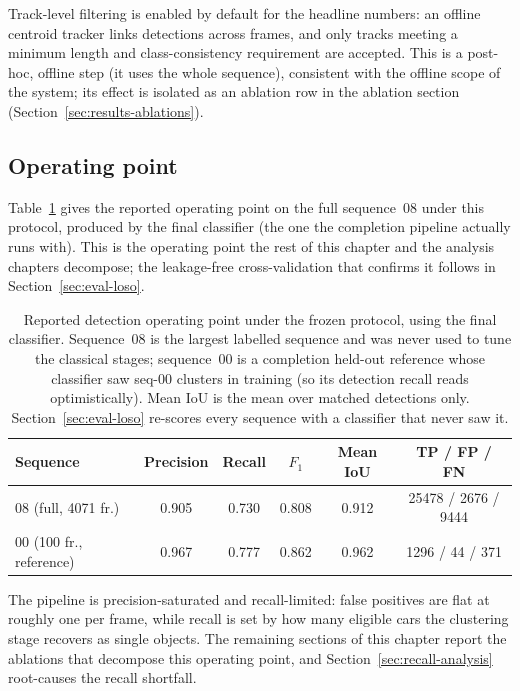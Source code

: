 Track-level filtering is enabled by default for the headline numbers: an offline
centroid tracker links detections across frames, and only tracks meeting a
minimum length and class-consistency requirement are accepted. This is a
post-hoc, offline step (it uses the whole sequence), consistent with the
offline scope of the system; its effect is isolated as an ablation row in the
ablation section (Section~\ref{sec:results-ablations}).

\subsection{Operating point}
\label{sec:eval-operating-point}

Table~\ref{tab:headline} gives the reported operating point on the full
sequence~08 under this protocol, produced by the final classifier (the one the
completion pipeline actually runs with). This is the operating point the rest of
this chapter and the analysis chapters decompose; the leakage-free
cross-validation that confirms it follows in Section~\ref{sec:eval-loso}.

\begin{table}[H]
  \centering
  \caption{Reported detection operating point under the frozen protocol, using
    the final classifier. Sequence~08 is the largest labelled sequence and was
    never used to tune the classical stages; sequence~00 is a completion held-out
    reference whose classifier saw seq-00 clusters in training (so its detection
    recall reads optimistically). Mean IoU is the mean over matched detections
    only. Section~\ref{sec:eval-loso} re-scores every sequence with a classifier
    that never saw it.}
  \label{tab:headline}
  \setlength{\tabcolsep}{5pt}
  \begin{tabular}{lccccc}
    \toprule
    Sequence & Precision & Recall & $F_1$ & Mean IoU & TP / FP / FN \\
    \midrule
    08 (full, \num{4071} fr.) & 0.905 & 0.730 & 0.808 & 0.912 & \num{25478} / \num{2676} / \num{9444} \\
    00 (100 fr., reference)   & 0.967 & 0.777 & 0.862 & 0.962 & \num{1296} / \num{44} / \num{371} \\
    \bottomrule
  \end{tabular}
\end{table}

The pipeline is precision-saturated and recall-limited: false positives are flat
at roughly one per frame, while recall is set by how many eligible cars the
clustering stage recovers as single objects. The remaining sections of this
chapter report the ablations that decompose this operating point, and Section~\ref{sec:recall-analysis}
root-causes the recall shortfall.

